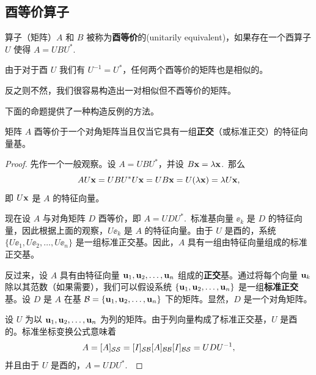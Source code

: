 \subsection{酉等价算子}\label{sec:05-06-04}

\begin{definition*}
算子（矩阵）$A$ 和 $B$ 被称为\textbf{酉等价}的(unitarily equivalent)，如果存在一个酉算子 $U$ 使得 $A = UBU^*$.~
\end{definition*}

由于对于酉 $U$ 我们有 $U^{-1} = U^*$，任何两个酉等价的矩阵也是相似的。

反之则不然，我们很容易构造出一对相似但不酉等价的矩阵。

下面的命题提供了一种构造反例的方法。

\begin{proposition}\label{stmt:05-06-05}
矩阵 $A$ 酉等价于一个对角矩阵当且仅当它具有一组\textbf{正交}（或标准正交）的特征向量基。
\end{proposition}

\begin{proof}先作一个一般观察。设 $A = UBU^*$，并设 $B\mathbf{x} = \lambda\mathbf{x}$.~那么
$$AU\mathbf{x} = UBU^*U\mathbf{x} = UB\mathbf{x} = U(\lambda\mathbf{x}) = \lambda U\mathbf{x},$$
即 $U\mathbf{x}$ 是 $A$ 的特征向量。

现在设 $A$ 与对角矩阵 $D$ 酉等价，即 $A = UDU^*$.~标准基向量 $\ee_k$ 是 $D$ 的特征向量，因此根据上面的观察，$U\ee_k$ 是 $A$ 的特征向量。由于 $U$ 是酉的，系统 $\{U\ee_1,U\ee_2,\dots,U\ee_n\}$ 是一组标准正交基。因此，$A$ 具有一组由特征向量组成的标准正交基。

反过来，设 $A$ 具有由特征向量 $\mathbf{u}_1, \mathbf{u}_2, \dots, \mathbf{u}_n$ 组成的\textbf{正交}基。通过将每个向量 $\mathbf{u}_k$ 除以其范数（如果需要），我们可以假设系统 $\{\mathbf{u}_1, \mathbf{u}_2, \dots, \mathbf{u}_n\}$ 是一组\textbf{标准正交}基。设 $D$ 是 $A$ 在基 $\mathcal{B} = \{\mathbf{u}_1, \mathbf{u}_2, \dots, \mathbf{u}_n\}$ 下的矩阵。显然，$D$ 是一个对角矩阵。

设 $U$ 为以 $\mathbf{u}_1, \mathbf{u}_2, \dots, \mathbf{u}_n$ 为列的矩阵。由于列向量构成了标准正交基，$U$ 是酉的。标准坐标变换公式意味着
$$A = [A]_{\mathcal{S}\mathcal{S}} = [I]_{\mathcal{S}\mathcal{B}}[A]_{\mathcal{B}\mathcal{B}}[I]_{\mathcal{B}\mathcal{S}} = UDU^{-1},$$
并且由于 $U$ 是酉的，$A = UDU^*$.~\end{proof}

